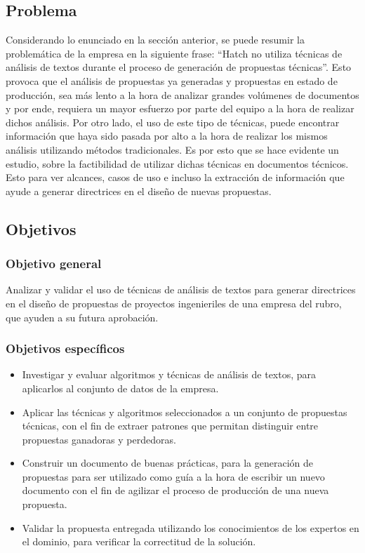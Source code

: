 \subsection{Problema}
Considerando lo enunciado en la sección anterior, se puede resumir la problemática de la empresa en la siguiente frase: ``Hatch no utiliza técnicas de análisis de textos durante el proceso de generación de propuestas técnicas''. Esto provoca que el análisis de propuestas ya generadas y propuestas en estado de producción, sea más lento a la hora de analizar grandes volúmenes de documentos y por ende, requiera un mayor esfuerzo por parte del equipo a la hora de realizar dichos análisis. Por otro lado, el uso de este tipo de técnicas, puede encontrar información que haya sido pasada por alto a la hora de realizar los mismos análisis utilizando métodos tradicionales. Es por esto que se hace evidente un estudio, sobre la factibilidad de utilizar dichas técnicas en documentos técnicos. Esto para ver alcances, casos de uso e incluso la extracción de información que ayude a generar directrices en el diseño de nuevas propuestas.


\subsection{Objetivos}

\subsubsection{Objetivo general} Analizar y validar el uso de técnicas de análisis de textos para generar directrices en el diseño de propuestas de proyectos ingenieriles de una empresa del rubro, que ayuden a su futura aprobación.


\subsubsection{Objetivos específicos}
\begin{itemize}
    \item Investigar y evaluar algoritmos y técnicas de análisis de textos, para aplicarlos al conjunto de datos de la empresa.
    \item Aplicar las técnicas y algoritmos seleccionados a un conjunto de propuestas técnicas, con el fin de extraer patrones que permitan distinguir entre propuestas ganadoras y perdedoras.
    \item Construir un documento de buenas prácticas, para la generación de propuestas para ser utilizado como guía a la hora de escribir un nuevo documento con el fin de  agilizar el proceso de producción de una nueva propuesta.
    \item  Validar la propuesta entregada utilizando los conocimientos de los expertos en el dominio, para verificar la correctitud de la solución.
    
\end{itemize}
